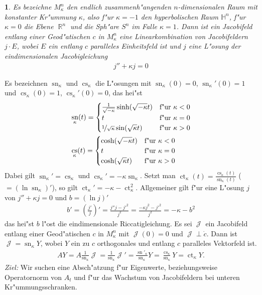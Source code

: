 \documentclass[paper=A4, twoside, chapterprefix=true, bibliography=totoc, headsepline]{scrbook}
\DeclareMathOperator{\R}{\mathbb{R}}
\renewcommand{\H}{\ensuremath{\mathbb{H}}}
\DeclareMathOperator{\calJ}{\mathcal{J}}
\DeclareMathOperator{\cs}{cs} %
\DeclareMathOperator{\ct}{ct} %
\DeclareMathOperator{\sn}{sn} %
\theoremstyle{plain}
\theoremstyle{nonumberplain}
\theoremstyle{empty}
\newtheorem{emptythm}{}%
\theoremstyle{break}
\begin{document}
\begin{emptythm}
  Es bezeichne $M_\kappa^n$ den endlich zusammenh"angenden $n$-dimensionalen Raum  mit konstanter Kr"ummung $\kappa$, also f"ur $\kappa = -1$ den hyperbolischen Raum $\H^n$, f"ur $\kappa = 0$ die Ebene $\R^n$ und die Sph"are $S^n$ im Falle $\kappa = 1$.
  Dann ist ein Jacobifeld entlang einer Geod"atischen $c$ in $M_\kappa^n$ eine Linearkombination von Jacobifeldern $j \cdot E$, wobei $E$ ein entlang $c$ paralleles Einheitsfeld ist und $j$ eine L"osung der eindimensionalen Jacobigleichung
  \begin{align*}
    j'' + \kappa j = 0
  \end{align*}\end{emptythm}

Es bezeichnen $\sn_\kappa$ und $\cs_\kappa$ die L"osungen mit $\sn_\kappa(0) = 0$, $\sn_\kappa'(0) = 1$ und $\cs_\kappa(0) = 1$, $\cs_\kappa'(0) = 0$, das hei"st
\begin{align*}
  &\sn_\kappa(t) = \begin{cases}
    \frac{1}{\sqrt{-\kappa}} \sinh(\sqrt{-\kappa}t) & \text{f"ur } \kappa < 0\\
    t & \text{f"ur } \kappa = 0\\
    \nicefrac{1}{\sqrt{\kappa}} \sin(\sqrt{\kappa}t) & \text{f"ur } \kappa > 0\\
  \end{cases}\\
  &\cs_\kappa(t) = \begin{cases}
    \cosh(\sqrt{-\kappa}t) & \text{f"ur } \kappa < 0\\
    t & \text{f"ur } \kappa = 0\\
    \cosh(\sqrt{\kappa}t) & \text{f"ur } \kappa > 0\\
  \end{cases}
\end{align*}
Dabei gilt $\sn_\kappa' = \cs_\kappa$ und $\cs_\kappa' = -\kappa \sn_\kappa$. Setzt man $\ct_\kappa(t) = \frac{\cs_\kappa(t)}{\sn_\kappa(t)}$ ($= (\ln \sn_\kappa)'$), so gilt $\ct_\kappa' = -\kappa - \ct_\kappa^2$. Allgemeiner gilt f"ur eine L"osung $j$ von $j'' + \kappa j = 0$ und $b = (\ln j)'$
\begin{align*}
  b' = \left( \frac{j'}{j} \right)' = \frac{j''j - {j'}^2}{j^2} = \frac{-\kappa j^2 - {j'}^2}{j^2} = -\kappa - b^2
\end{align*}
das hei"st $b$ l"ost die eindimensionale Riccatigleichung.
Es sei $\calJ$ ein Jacobifeld entlang einer Geod"atischen $c$ in $M^n_{\kappa}$ mit $\calJ(0) = 0$ und $\calJ \perp \dot c$.
Dann ist $\calJ = \sn_{\kappa}Y$, wobei $Y$ ein zu $c$ orthogonales und entlang $c$ paralleles Vektorfeld ist.
\begin{align*}
  AY = A \frac{1}{\sn_{\kappa}}\calJ
  = \frac{1}{\sn_{\kappa}}\calJ'
  = \frac{\sn'_{\kappa}}{\sn_{\kappa}}Y
  = \frac{\cs_{\kappa}}{\sn_{\kappa}}Y
  = \ct_{\kappa}Y.
\end{align*}
\emph{Ziel:} Wir suchen eine Absch"atzung f"ur Eigenwerte, beziehungsweise Operatornorm von $A_t$ und f"ur das Wachstum von Jacobifeldern bei unteren Kr"ummungsschranken.
\end{document}
